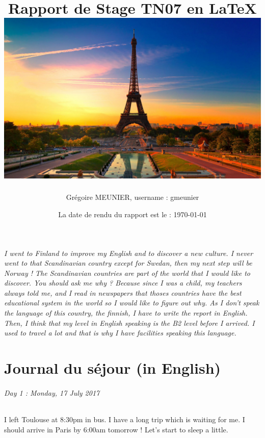 \documentclass[a4paper,12pt]{report} %
\title{Rapport de Stage TN07 en \LaTeX \newline \newline
	\includegraphics[width=\linewidth]{france.jpg}
}
\author{Grégoire MEUNIER, username : gmeunier}
\date{La date de rendu du rapport est le : \today}
\begin{document}
\maketitle
\newpage %

\tableofcontents



\newpage%
\paragraph{I went to Finland to improve my English and to discover a new culture. I never went to that Scandinavian country except for Swedan, then my next step will be Norway ! The Scandinavian countries are part of the world that I would like to discover. You should ask me why ? Because since I was a child, my teachers always told me, and I read in newspapers that thoses countries have the best educational system in the world so I would like to figure out why.
As I don't speak the language of this country, the finnish, I have to write the report in English. Then, I think that my level in English speaking is the B2 level before I arrived. I used to travel a lot and that is why I have facilities speaking this language.}


\newpage
\part{Journal du séjour (in English)}%
\label{p:1}

\paragraph{Day 1 : Monday, 17 July 2017}
\subparagraph{I left Toulouse at 8:30pm in bus. I have a long trip which is waiting for me. I should arrive in Paris by 6:00am tomorrow ! Let's start to sleep a little.}
\end{document}
